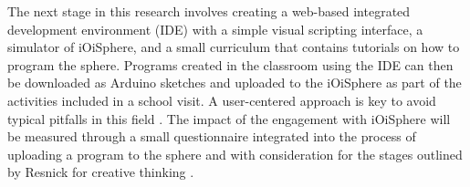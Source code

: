 \documentclass[sigconf,screen]{acmart}
\begin{document}
The next stage in this research involves creating a web-based integrated development environment (IDE) with a simple visual scripting interface, a simulator of iOiSphere, and a small curriculum that contains tutorials on how to program the sphere. Programs created in the classroom using the IDE can then be downloaded as Arduino sketches and uploaded to the iOiSphere as part of the activities included in a school visit. A user-centered approach is key to avoid typical pitfalls in this field \cite{Hansen}. The impact of the engagement with iOiSphere will be measured through a small questionnaire integrated into the process of uploading a program to the sphere and with consideration for the stages outlined by Resnick for creative thinking \cite{Resnick:2007:IRN:1254960.1254961}.



\end{document}
